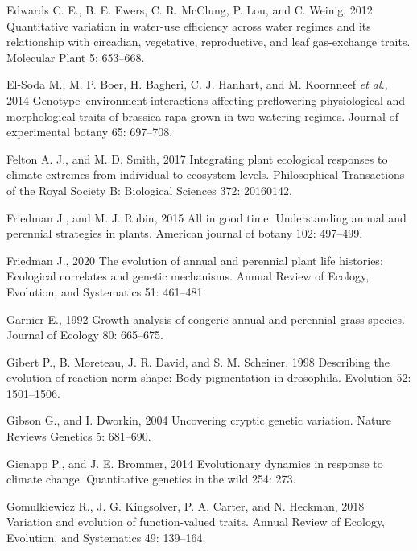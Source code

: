 \documentclass[jou,floatsintext]{apa6}
\begin{document}
\leavevmode\hypertarget{ref-edwards2012quantitative}{}%
Edwards C. E., B. E. Ewers, C. R. McClung, P. Lou, and C. Weinig, 2012 Quantitative variation in water-use efficiency across water regimes and its relationship with circadian, vegetative, reproductive, and leaf gas-exchange traits. Molecular Plant 5: 653--668.

\leavevmode\hypertarget{ref-el2014genotype}{}%
El-Soda M., M. P. Boer, H. Bagheri, C. J. Hanhart, and M. Koornneef \emph{et al.}, 2014 Genotype--environment interactions affecting preflowering physiological and morphological traits of brassica rapa grown in two watering regimes. Journal of experimental botany 65: 697--708.

\leavevmode\hypertarget{ref-felton2017integrating}{}%
Felton A. J., and M. D. Smith, 2017 Integrating plant ecological responses to climate extremes from individual to ecosystem levels. Philosophical Transactions of the Royal Society B: Biological Sciences 372: 20160142.

\leavevmode\hypertarget{ref-friedman2015all}{}%
Friedman J., and M. J. Rubin, 2015 All in good time: Understanding annual and perennial strategies in plants. American journal of botany 102: 497--499.

\leavevmode\hypertarget{ref-friedman2020evolution}{}%
Friedman J., 2020 The evolution of annual and perennial plant life histories: Ecological correlates and genetic mechanisms. Annual Review of Ecology, Evolution, and Systematics 51: 461--481.

\leavevmode\hypertarget{ref-garnier1992growth}{}%
Garnier E., 1992 Growth analysis of congeric annual and perennial grass species. Journal of Ecology 80: 665--675.

\leavevmode\hypertarget{ref-gibert1998describing}{}%
Gibert P., B. Moreteau, J. R. David, and S. M. Scheiner, 1998 Describing the evolution of reaction norm shape: Body pigmentation in drosophila. Evolution 52: 1501--1506.

\leavevmode\hypertarget{ref-gibson2004uncovering}{}%
Gibson G., and I. Dworkin, 2004 Uncovering cryptic genetic variation. Nature Reviews Genetics 5: 681--690.

\leavevmode\hypertarget{ref-gienapp2014evolutionary}{}%
Gienapp P., and J. E. Brommer, 2014 Evolutionary dynamics in response to climate change. Quantitative genetics in the wild 254: 273.

\leavevmode\hypertarget{ref-gomulkiewicz2018variation}{}%
Gomulkiewicz R., J. G. Kingsolver, P. A. Carter, and N. Heckman, 2018 Variation and evolution of function-valued traits. Annual Review of Ecology, Evolution, and Systematics 49: 139--164.
\end{document}
